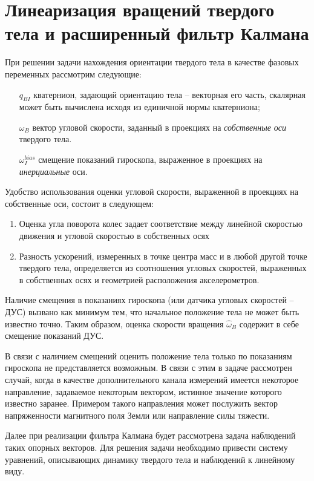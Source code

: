 \documentclass{article}
\begin{document}
\section{Линеаризация вращений твердого тела и расширенный фильтр Калмана}
При решении задачи нахождения ориентации твердого тела в качестве фазовых
переменных рассмотрим следующие:
\begin{itemize}
\item[$q_{BI}$] кватернион, задающий ориентацию тела -- векторная его часть,
    скалярная может быть вычислена исходя из единичной нормы кватерниона;
\item[$\omega_B$] вектор угловой скорости, заданный в проекциях на \emph{собственные
    оси} твердого тела.
\item[$\omega_{I}^{bias}$] смещение показаний гироскопа, выраженное в
    проекциях на \emph{инерциальные} оси.
\end{itemize}
Удобство использования оценки угловой скорости, выраженной в проекциях на
собственные оси, состоит в следующем:
\begin{enumerate}
    \item Оценка угла поворота колес задает соответствие между линейной
        скоростью движения и угловой скоростью в собственных осях
    \item Разность ускорений, измеренных в точке центра масс и в любой другой
        точке твердого тела, определяется из соотношения угловых скоростей,
        выраженных в собственных осях и геометрией расположения
        акселерометров.
\end{enumerate}

Наличие смещения в показаниях гироскопа (или датчика угловых скоростей -- ДУС)
вызвано как минимум тем, что начальное положение тела не может быть известно
точно. Таким образом, оценка скорости вращения $\hat{\omega}_B$ содержит в
себе смещение показаний ДУС.

В связи с наличием смещений оценить положение тела только по показаниям
гироскопа не представляется возможным. В связи с этим в задаче рассмотрен
случай, когда в качестве дополнительного канала измерений имеется некоторое
направление, задаваемое некоторым вектором, истинное значение которого
известно заранее. Примером такого направления может послужить вектор
напряженности магнитного поля Земли или направление силы тяжести.

Далее при реализации фильтра Калмана будет рассмотрена задача наблюдений таких
опорных векторов. Для решения задачи необходимо привести систему уравнений,
описывающих динамику твердого тела и наблюдений к линейному виду.
\end{document}
